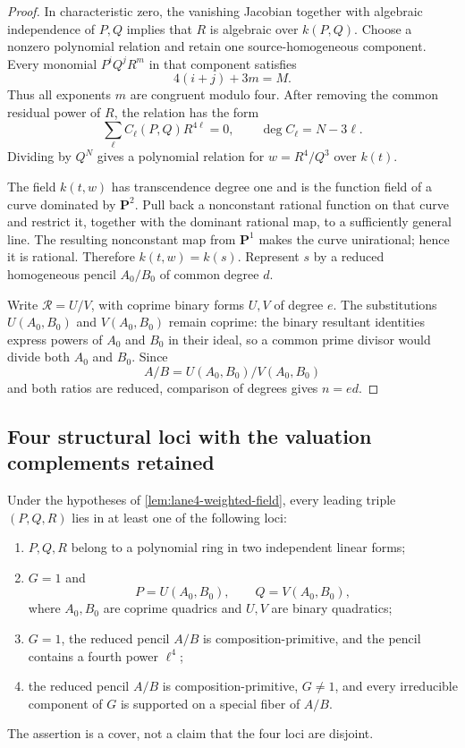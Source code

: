 \begin{proof}
In characteristic zero, the vanishing Jacobian together with algebraic
independence of \(P,Q\) implies that \(R\) is algebraic over \(k(P,Q)\).
Choose a nonzero polynomial relation and retain one source-homogeneous
component.  Every monomial \(P^iQ^jR^m\) in that component satisfies
\[
 4(i+j)+3m=M.
\]
Thus all exponents \(m\) are congruent modulo four.  After removing the
common residual power of \(R\), the relation has the form
\[
 \sum_{\ell} C_\ell(P,Q)R^{4\ell}=0,
 \qquad \deg C_\ell=N-3\ell.
\]
Dividing by \(Q^N\) gives a polynomial relation for
\(w=R^4/Q^3\) over \(k(t)\).

The field \(k(t,w)\) has transcendence degree one and is the function field
of a curve dominated by \(\mathbf P^2\).  Pull back a nonconstant rational
function on that curve and restrict it, together with the dominant rational
map, to a sufficiently general line.  The resulting nonconstant map from
\(\mathbf P^1\) makes the curve unirational; hence it is rational.  Therefore
\(k(t,w)=k(s)\).  Represent \(s\) by a reduced homogeneous pencil
\(A_0/B_0\) of common degree \(d\).

Write \(\mathcal R=U/V\), with coprime binary forms \(U,V\) of degree \(e\).
The substitutions \(U(A_0,B_0)\) and \(V(A_0,B_0)\) remain coprime: the
binary resultant identities express powers of \(A_0\) and \(B_0\) in their
ideal, so a common prime divisor would divide both \(A_0\) and \(B_0\).
Since
\[
 A/B=U(A_0,B_0)/V(A_0,B_0)
\]
and both ratios are reduced, comparison of degrees gives \(n=ed\).
\end{proof}

\subsection{Four structural loci with the valuation complements retained}

\begin{proposition}
\label{prop:lane4-four-loci}
Under the hypotheses of \cref{lem:lane4-weighted-field}, every leading
triple \((P,Q,R)\) lies in at least one of the following loci:
\begin{enumerate}
\item \(P,Q,R\) belong to a polynomial ring in two independent linear forms;
\item \(G=1\) and
\[
 P=U(A_0,B_0),\qquad Q=V(A_0,B_0),
\]
where \(A_0,B_0\) are coprime quadrics and \(U,V\) are binary quadratics;
\item \(G=1\), the reduced pencil \(A/B\) is composition-primitive, and the
pencil contains a fourth power \(\ell^4\);
\item the reduced pencil \(A/B\) is composition-primitive, \(G\ne1\), and
every irreducible component of \(G\) is supported on a special fiber of
\(A/B\).
\end{enumerate}
The assertion is a cover, not a claim that the four loci are disjoint.
\end{proposition}

